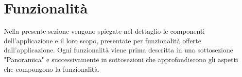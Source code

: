 \documentclass[../ManualeSviluppatore.tex]{subfiles}
\begin{document}
\section{Funzionalità}
	Nella presente sezione vengono spiegate nel dettaglio le componenti dell'applicazione e il loro scopo, presentate per funzionalità offerte dall'applicazione.
	Ogni funzionalità viene prima descritta in una sottosezione "Panoramica" e successivamente in sottosezioni che approfondiscono gli aspetti che compongono la funzionalità.
	
	
	
	
	
	
	
	
\end{document}

